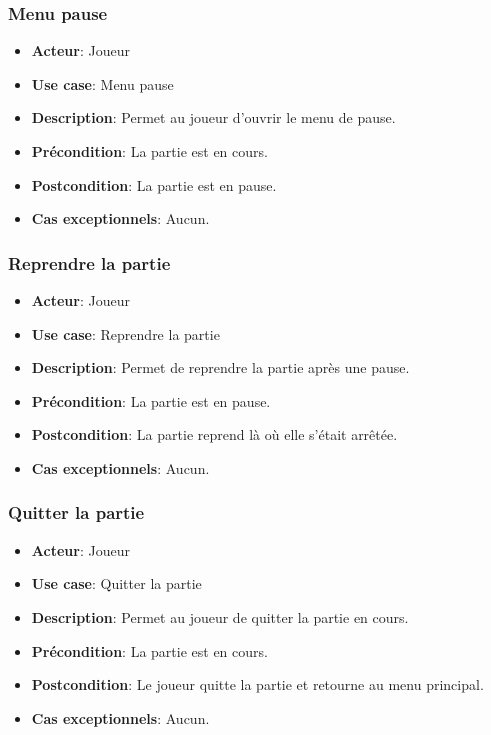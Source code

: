\documentclass{article}
\begin{document}
\subsubsection*{Menu pause}
\begin{itemize}
    \item \textbf{Acteur}: Joueur
    \item \textbf{Use case}: Menu pause
    \item \textbf{Description}: Permet au joueur d'ouvrir le menu de pause.
    \item \textbf{Précondition}: La partie est en cours.
    \item \textbf{Postcondition}: La partie est en pause.
    \item \textbf{Cas exceptionnels}: Aucun.
\end{itemize}

\subsubsection*{Reprendre la partie}
\begin{itemize}
    \item \textbf{Acteur}: Joueur
    \item \textbf{Use case}: Reprendre la partie
    \item \textbf{Description}: Permet de reprendre la partie après une pause.
    \item \textbf{Précondition}: La partie est en pause.
    \item \textbf{Postcondition}: La partie reprend là où elle s'était arrêtée.
    \item \textbf{Cas exceptionnels}: Aucun.
\end{itemize}

\subsubsection*{Quitter la partie}
\begin{itemize}
    \item \textbf{Acteur}: Joueur
    \item \textbf{Use case}: Quitter la partie
    \item \textbf{Description}: Permet au joueur de quitter la partie en cours.
    \item \textbf{Précondition}: La partie est en cours.
    \item \textbf{Postcondition}: Le joueur quitte la partie et retourne au menu principal.
    \item \textbf{Cas exceptionnels}: Aucun.
\end{itemize}
\end{document}
